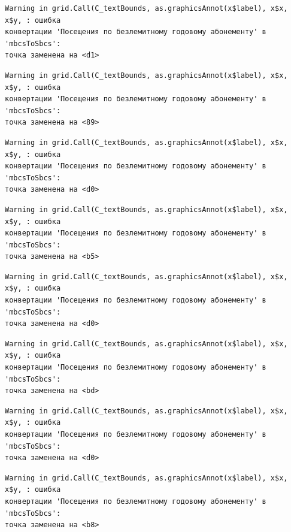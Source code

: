 \documentclass[
  letterpaper,
  DIV=11,
  numbers=noendperiod]{scrreprt}
\begin{document}
\begin{verbatim}
Warning in grid.Call(C_textBounds, as.graphicsAnnot(x$label), x$x, x$y, : ошибка
конвертации 'Посещения по безлемитному годовому абонементу' в 'mbcsToSbcs':
точка заменена на <d1>
\end{verbatim}

\begin{verbatim}
Warning in grid.Call(C_textBounds, as.graphicsAnnot(x$label), x$x, x$y, : ошибка
конвертации 'Посещения по безлемитному годовому абонементу' в 'mbcsToSbcs':
точка заменена на <89>
\end{verbatim}

\begin{verbatim}
Warning in grid.Call(C_textBounds, as.graphicsAnnot(x$label), x$x, x$y, : ошибка
конвертации 'Посещения по безлемитному годовому абонементу' в 'mbcsToSbcs':
точка заменена на <d0>
\end{verbatim}

\begin{verbatim}
Warning in grid.Call(C_textBounds, as.graphicsAnnot(x$label), x$x, x$y, : ошибка
конвертации 'Посещения по безлемитному годовому абонементу' в 'mbcsToSbcs':
точка заменена на <b5>
\end{verbatim}

\begin{verbatim}
Warning in grid.Call(C_textBounds, as.graphicsAnnot(x$label), x$x, x$y, : ошибка
конвертации 'Посещения по безлемитному годовому абонементу' в 'mbcsToSbcs':
точка заменена на <d0>
\end{verbatim}

\begin{verbatim}
Warning in grid.Call(C_textBounds, as.graphicsAnnot(x$label), x$x, x$y, : ошибка
конвертации 'Посещения по безлемитному годовому абонементу' в 'mbcsToSbcs':
точка заменена на <bd>
\end{verbatim}

\begin{verbatim}
Warning in grid.Call(C_textBounds, as.graphicsAnnot(x$label), x$x, x$y, : ошибка
конвертации 'Посещения по безлемитному годовому абонементу' в 'mbcsToSbcs':
точка заменена на <d0>
\end{verbatim}

\begin{verbatim}
Warning in grid.Call(C_textBounds, as.graphicsAnnot(x$label), x$x, x$y, : ошибка
конвертации 'Посещения по безлемитному годовому абонементу' в 'mbcsToSbcs':
точка заменена на <b8>
\end{verbatim}
\end{document}

